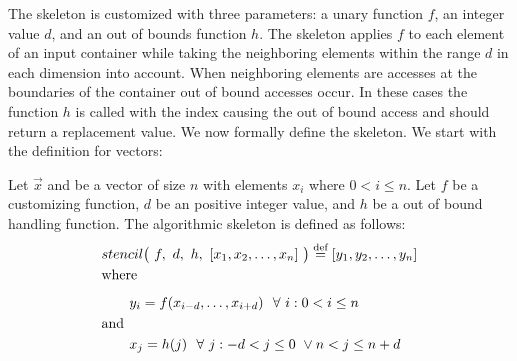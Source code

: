 The \stencil skeleton is customized with three parameters: a unary function $f$, an integer value $d$, and an out of bounds function $h$.
The skeleton applies $f$ to each element of an input container while taking the neighboring elements within the range $d$ in each dimension into account.
When neighboring elements are accesses at the boundaries of the container out of bound accesses occur.
In these cases the function $h$ is called with the index causing the out of bound access and should return a replacement value.
We now formally define the \stencil skeleton. We start with the definition for vectors:
\begin{definition}
  \label{definition:mapoverlap}
  Let $\vec{x}$ and be a vector of size $n$ with elements $x_i$ where $0 < i \leq n$.
  Let $f$ be a customizing function, $d$ be an positive integer value, and $h$ be a out of bound handling function.
  The algorithmic skeleton \stencil is defined as follows:
  \begin{equation*}
    \begin{split}
    &stencil \big(\ f,\  d,\ h,\ [x_1, x_2, \dots, x_n]\ \big) \eqdef [y_1, y_2, \dots, y_n]\\
    &\text{where}\\[.5em]
    &\qquad y_i = f(x_{i-d}, \ldots, x_{i+d}) \ \ \forall\ i :  0 < i \leq n\\
    &\text{and\hfill}\\
    &\qquad x_j = h(j) \ \ \forall\ j : -d < j \leq 0\ \vee n < j \leq n+d
    \end{split}
  \end{equation*}
\end{definition}

